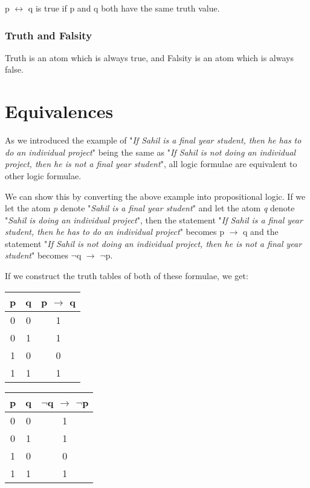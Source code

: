 \documentclass{report}
\begin{document}
p $\leftrightarrow$ q is true if p and q both have the same truth value.

\subsubsection{Truth and Falsity}
Truth is an atom which is always true, and Falsity is an atom which is always false.

\section{Equivalences}
As we introduced the example of "\emph{If Sahil is a final year student, 
then he has to do an individual project}" being the same as "\emph{If Sahil is not 
doing an individual project, then he is not a final year student}", all logic
formulae are equivalent to other logic formulae.

We can show this by converting the above example into propositional logic. If we let
the atom \emph{p} denote "\emph{Sahil is a final year student}" and let the atom \emph{q}
denote "\emph{Sahil is doing an individual project}", then the statement "\emph{If Sahil 
is a final year student, then he has to do an individual project}" becomes p $\to$ q
and the statement "\emph{If Sahil is not doing an individual project, then he is 
not a final year student}" becomes $\neg$q $\to$ $\neg$p.

If we construct the truth tables of both of these formulae, we get:

\begin{center}
  \begin{tabular}{| c | c | c |}
    \hline
    p & q & p $\to$ q \\ \hline
    0 & 0 & 1 \\
    0 & 1 & 1 \\
    1 & 0 & 0 \\
    1 & 1 & 1 \\ \hline
  \end{tabular}
\end{center}

\begin{center}
  \begin{tabular}{| c | c | c |}
    \hline
    p & q & $\neg$q $\to$ $\neg$p \\ \hline
    0 & 0 & 1 \\
    0 & 1 & 1 \\
    1 & 0 & 0 \\
    1 & 1 & 1 \\ \hline
  \end{tabular}
\end{center}
\end{document}
